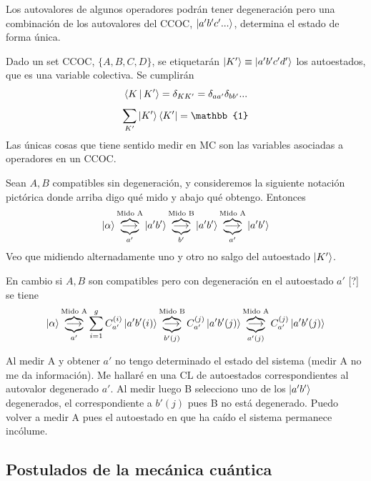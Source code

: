 \documentclass[10pt,oneside]{CBFT_book}
\begin{document}
Los autovalores de algunos operadores podrán tener degeneración pero una combinación de los autovalores del CCOC, 
$\Ket{a'b'c'...}$, determina el estado de forma única.

Dado un set CCOC, $\{A,B,C,D\}$, se etiquetarán $\Ket{K'} \equiv \Ket{a'b'c'd'}$ los autoestados,
que es una variable colectiva.
Se cumplirán
\[
	\Braket{K | K'} = \delta_{KK'} = \delta_{aa'} \delta_{bb'} ...
\]
\[
	\sum_{K'} \Ket{K'}\Bra{K'} = \mathbb{1}
\]
Las únicas cosas que tiene sentido medir en MC son las variables asociadas a operadores en un CCOC.

Sean $A,B$ compatibles sin degeneración, y consideremos la siguiente notación pictórica donde
arriba digo qué mido y abajo qué obtengo. Entonces
\[
	\Ket{\alpha} \overbrace{\underbrace{\longrightarrow}_{a'}}^{\text{Mido A}} \Ket{a'b'}
	\overbrace{\underbrace{\longrightarrow}_{b'}}^{\text{Mido B}} \Ket{a'b'} 
	\overbrace{\underbrace{\longrightarrow}_{a'}}^{\text{Mido A}} \Ket{a'b'}
\]
Veo que midiendo alternadamente uno y otro no salgo del autoestado $\Ket{K'}$. 

En cambio si $A,B$ son compatibles pero con degeneración en el autoestado $a'$ [?] se tiene
\[
	\Ket{\alpha} \overbrace{\underbrace{\longrightarrow}_{a'}}^{\text{Mido A}} 
		\sum_{i=1}^g C_{a'}^{(i)}\Ket{a'b'(i)} \overbrace{\underbrace{\longrightarrow}_{b'(j)}}^{\text{Mido B}} 
		C_{a'}^{(j)}\Ket{a'b'(j)} \overbrace{\underbrace{\longrightarrow}_{a'(j)}}^{\text{Mido A}} 
		C_{a'}^{(j)} \Ket{a'b'(j)}
\]

Al medir A y obtener $a'$ no tengo determinado el estado del sistema (medir A no me da información). 
Me hallaré en una CL de autoestados correspondientes al autovalor degenerado $a'$. Al medir luego B 
selecciono uno de los $\Ket{a'b'}$ degenerados, el correspondiente a $b'(j)$ pues B no está degenerado. 
Puedo volver a medir A pues el autoestado en que ha caído el sistema permanece incólume.


\subsection{Postulados de la mecánica cuántica}
\end{document}
